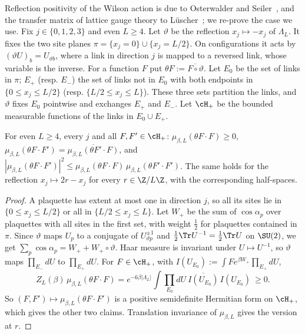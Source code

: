 Reflection positivity of the Wilson action is due to Osterwalder and Seiler~\cite{OS78}, and the transfer matrix of lattice gauge theory to L\"uscher~\cite{Lu77}; we re-prove the case we use. Fix $j\in\{0,1,2,3\}$ and even $L\ge4$. Let $\vartheta$ be the reflection $x_j\mapsto-x_j$ of $\Lambda_L$. It fixes the two site planes $\pi=\{x_j=0\}\cup\{x_j=L/2\}$. On configurations it acts by $(\vartheta U)_{b}=U_{\vartheta b}$, where a link in direction $j$ is mapped to a reversed link, whose variable is the inverse. For a function $F$ put $\theta F:=\overline{F\circ\vartheta}$.
Let $E_0$ be the set of links in $\pi$; $E_+$ (resp. $E_-$) the set of links not in $E_0$ with both endpoints in $\{0\le x_j\le L/2\}$ (resp. $\{L/2\le x_j\le L\}$). These three sets partition the links, and $\vartheta$ fixes $E_0$ pointwise and exchanges $E_+$ and $E_-$. Let $\cH_+$ be the bounded measurable functions of the links in $E_0\cup E_+$.

\begin{lemma}\label{pf:lem-rp}
For even $L\ge4$, every $j$ and all $F,F'\in\cH_+$: $\mu_{\beta,L}(\theta F\cdot F)\ge0$, $\mu_{\beta,L}(\theta F\cdot F')=\overline{\mu_{\beta,L}(\theta F'\cdot F)}$, and $|\mu_{\beta,L}(\theta F\cdot F')|^2\le\mu_{\beta,L}(\theta F\cdot F)\,\mu_{\beta,L}(\theta F'\cdot F')$. The same holds for the reflection $x_j\mapsto2r-x_j$ for every $r\in\Z/L\Z$, with the corresponding half-spaces.
\end{lemma}

\begin{proof}
A plaquette has extent at most one in direction $j$, so all its sites lie in $\{0\le x_j\le L/2\}$ or all in $\{L/2\le x_j\le L\}$. Let $W_+$ be the sum of $\cos\alpha_p$ over plaquettes with all sites in the first set, with weight $\tfrac12$ for plaquettes contained in $\pi$. Since $\vartheta$ maps $U_p$ to a conjugate of $U_{\vartheta p}^{\pm1}$ and $\tfrac12\Tr U^{-1}=\tfrac12\Tr U$ on $\SU(2)$, we get $\sum_p\cos\alpha_p=W_++W_+\circ\vartheta$. Haar measure is invariant under $U\mapsto U^{-1}$, so $\vartheta$ maps $\prod_{E_-}dU$ to $\prod_{E_+}dU$. For $F\in\cH_+$, with $I(U_{E_0}):=\int F e^{\beta W_+}\prod_{E_+}dU$,
\[
Z_L(\beta)\,\mu_{\beta,L}(\theta F\cdot F)=e^{-6\beta|\Lambda_L|}\int\prod_{E_0}dU\ \overline{I(U_{E_0})}\,I(U_{E_0})\ \ge0 .
\]
So $(F,F')\mapsto\mu_{\beta,L}(\theta F\cdot F')$ is a positive semidefinite Hermitian form on $\cH_+$, which gives the other two claims. Translation invariance of $\mu_{\beta,L}$ gives the version at $r$.
\end{proof}

